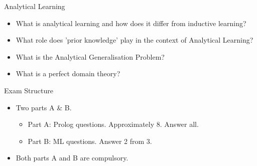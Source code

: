 \documentclass[%
pdf,
colorBG,
slideColor,
tcrico,
]{prosper}
\begin{document}
\begin{slide}{Analytical Learning} 
\begin{itemize}
\item What is analytical  learning and how does it differ from inductive learning?
\item What role does 'prior knowledge' play in the context of Analytical Learning?
\item What is the Analytical Generalisation Problem?
\item What is a perfect domain theory?
\end{itemize}
\end{slide}

\begin{slide}{Exam Structure} 
\begin{itemize}
\item Two parts A \& B. 
	\begin{itemize}
	\item Part A: Prolog questions. Approximately 8. Answer all.
	\item Part B: ML questions. Answer 2 from 3. 
	\end{itemize}
\item Both parts A and B are compulsory.
\end{itemize}
\end{slide}
\end{document}
